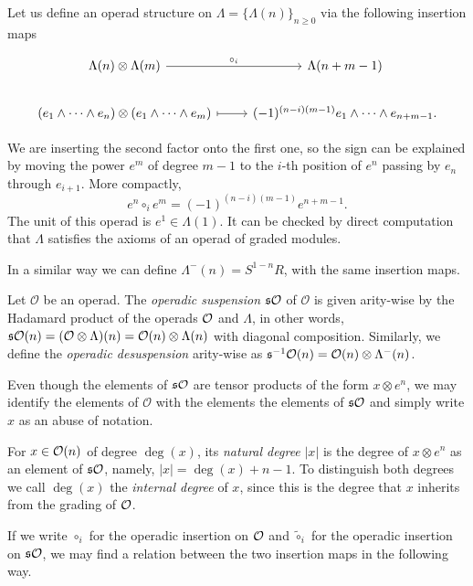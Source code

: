 \documentclass[Thesis.tex]{subfiles}
\begin{document}
Let us define an operad structure on $\Lambda=\{\Lambda(n)\}_{n\geq 0}$ via the following insertion maps

\[
\begin{tikzcd}
\Lambda(n)\otimes\Lambda(m) \arrow[r, "\circ_i"] & \Lambda(n+m-1)\\
(e_1\land\cdots\land e_n)\otimes(e_1\land\cdots\land e_m)\arrow[r, mapsto] & (-1)^{(n-i)(m-1)}e_1\land\cdots\land e_{n+m-1}.
\end{tikzcd}
\]

We are inserting the second factor onto the first one, so the sign can be explained  by moving the power $e^m$ of degree $m-1$ to the $i$-th position of $e^n$ passing by $e_{n}$ through $e_{i+1}$. More compactly, \[e^n\circ_i e^m=(-1)^{(n-i)(m-1)}e^{n+m-1}.\] The unit of this operad is $e^1\in\Lambda(1)$. It can be checked by direct computation that $\Lambda$ satisfies the axioms of an operad of graded modules.

In a similar way we can define $\Lambda^-(n)=S^{1-n}R$, with the same insertion maps.

\begin{defin}
Let $\mathcal{O}$ be an operad. The \emph{operadic suspension} $\mathfrak{s}{\mathcal O}$ of $\mathcal{O}$ is given arity-wise by the Hadamard product of the operads ${\mathcal O}$ and $\Lambda$, in other words, $\mathfrak{s}{\mathcal O}(n)=(\mathcal{O}\otimes\Lambda)(n)=\mathcal{O}(n)\otimes\Lambda(n)$ with diagonal composition. Similarly, we define the \emph{operadic desuspension} arity-wise as $\mathfrak{s}^{-1}{\mathcal O}(n)=\mathcal{O}(n)\otimes\Lambda^-(n)$.
\end{defin}


Even though the elements of $\mathfrak{s}{\mathcal O}$ are tensor products of the form $x\otimes e^n$, we may identify the elements of $\mathcal{O}$ with the elements the elements of $\mathfrak{s}{\mathcal O}$ and simply write $x$ as an abuse of notation. 

\begin{defin}
For $x\in{\mathcal O}(n)$ of degree $\deg(x)$, its \emph{natural degree} $|x|$ is the degree of $x\otimes e^n$ as an element of $\mathfrak{s}{\mathcal O}$, namely, $|x|=\deg(x)+n-1$. To distinguish both degrees we call $\deg(x)$ the \emph{internal degree} of $x$, since this is the degree that $x$ inherits from the grading of ${\mathcal O}$. 
\end{defin}

If we write $\circ_i$ for the operadic insertion on ${\mathcal O}$ and $\tilde{\circ}_i$ for the operadic insertion on $\mathfrak{s}{\mathcal O}$, we may find a relation between the two insertion maps in the following way. 
\end{document}
